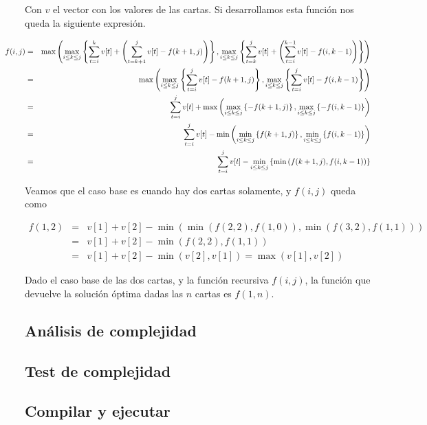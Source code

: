 Con $v$ el vector con los valores de las cartas. Si desarrollamos esta funci\'on nos queda la siguiente expresi\'on. 

\begin{eqnarray*}\hspace*{-4cm}
  f(i,j) &=& \max\left( 
      \max_{i \leq k \leq j}\left\{ \sum_{t=i}^k v[t] + \left( \sum_{t=k+1}^{j} v[t] - f(k+1,j) \right) \right\},  
      \max_{i \leq k \leq j}\left\{ \sum_{t=k}^j v[t] + \left( \sum_{t=i}^{k-1} v[t] - f(i,k-1) \right) \right\} 
    \right) \\
    &=& \max \left(
      \max_{i \leq k \leq j}\left\{ \sum_{t=i}^j v[t] - f(k+1,j) \right\},  
      \max_{i \leq k \leq j}\left\{ \sum_{t=i}^j v[t] - f(i,k-1) \right\} 
    \right) \\
    &=& \sum_{t=i}^j v[t] + \max \left(
      \max_{i \leq k \leq j}\left\{ - f(k+1,j) \right\},  
      \max_{i \leq k \leq j}\left\{ - f(i,k-1) \right\} 
    \right) \\
    &=& \sum_{t=i}^j v[t] - \min \left(
      \min_{i \leq k \leq j}\left\{ f(k+1,j) \right\},  
      \min_{i \leq k \leq j}\left\{ f(i,k-1) \right\} 
    \right) \\
    &=& \sum_{t=i}^j v[t] - \min_{i \leq k \leq j}\left\{ \min \left( f(k+1,j), f(i,k-1) \right) \right\} 
\end{eqnarray*}

Veamos que el caso base es cuando hay dos cartas solamente, y $f(i,j)$ queda como 

\begin{eqnarray*}
f(1,2) &=& v[1]+v[2] - \min( \min( f(2,2), f(1,0) ), \min( f(3,2), f(1,1) ) ) \\
       &=& v[1]+v[2] - \min( f(2,2), f(1,1) ) \\
       &=& v[1]+v[2] - \min( v[2], v[1] ) = \max( v[1], v[2] )
\end{eqnarray*}

Dado el caso base de las dos cartas, y la funci\'on recursiva $f(i,j)$, la funci\'on que devuelve la soluci\'on \'optima dadas las $n$ cartas es $f(1,n)$. 

\subsection{An\'alisis de complejidad}

\subsection{Test de complejidad}

\subsection{Compilar y ejecutar}
